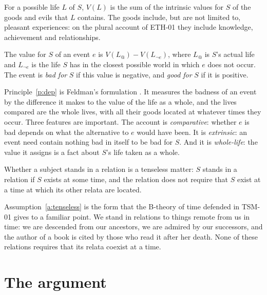 \documentclass{situationist-preprint}
\begin{document}
\begin{definition}\label{d:value}
For a possible life $L$ of $S$, $V(L)$ is the sum of the intrinsic values for $S$ of the goods and evils that $L$ contains. The goods include, but are not limited to, pleasant experiences: on the plural account of ETH-01 they include knowledge, achievement and relationships.
\end{definition}

\begin{principle}[Deprivation]\label{p:dep}
The value for $S$ of an event $e$ is $V(L_{@}) - V(L_{\neg e})$, where $L_{@}$ is $S$'s actual life and $L_{\neg e}$ is the life $S$ has in the closest possible world in which $e$ does not occur. The event is \emph{bad for} $S$ if this value is negative, and \emph{good for} $S$ if it is positive.
\end{principle}

Principle~\ref{p:dep} is Feldman's formulation \citep{Feldman1991}. It measures the badness of an event by the difference it makes to the value of the life as a whole, and the lives compared are the whole lives, with all their goods located at whatever times they occur. Three features are important. The account is \emph{comparative}: whether $e$ is bad depends on what the alternative to $e$ would have been. It is \emph{extrinsic}: an event need contain nothing bad in itself to be bad for $S$. And it is \emph{whole-life}: the value it assigns is a fact about $S$'s life taken as a whole.

\begin{assumption}\label{a:tenseless}
Whether a subject stands in a relation is a tenseless matter: $S$ stands in a relation if $S$ exists at some time, and the relation does not require that $S$ exist at a time at which its other relata are located.
\end{assumption}

Assumption~\ref{a:tenseless} is the form that the B-theory of time defended in TSM-01 gives to a familiar point. We stand in relations to things remote from us in time: we are descended from our ancestors, we are admired by our successors, and the author of a book is cited by those who read it after her death. None of these relations requires that its relata coexist at a time.

\section{The argument}\label{s:arg}
\end{document}

